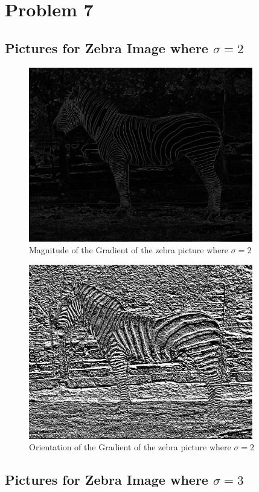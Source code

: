 \documentclass[11pt,psfig]{article}
\begin{document}
\section*{Problem 7}

\subsection*{Pictures for Zebra Image where $\sigma=2$}

\begin{figure}[H]
\centering
\includegraphics[height=3in]{magGradient_zebra1.jpg}
\caption{Magnitude of the Gradient of the zebra picture where $\sigma=2$}
\end{figure}

\begin{figure}[H]
\centering
\includegraphics[height=3in]{orientGradient_zebra1.jpg}
\caption{Orientation of the Gradient of the zebra picture where $\sigma=2$}
\end{figure}

\subsection*{Pictures for Zebra Image where $\sigma=3$}
\end{document}
